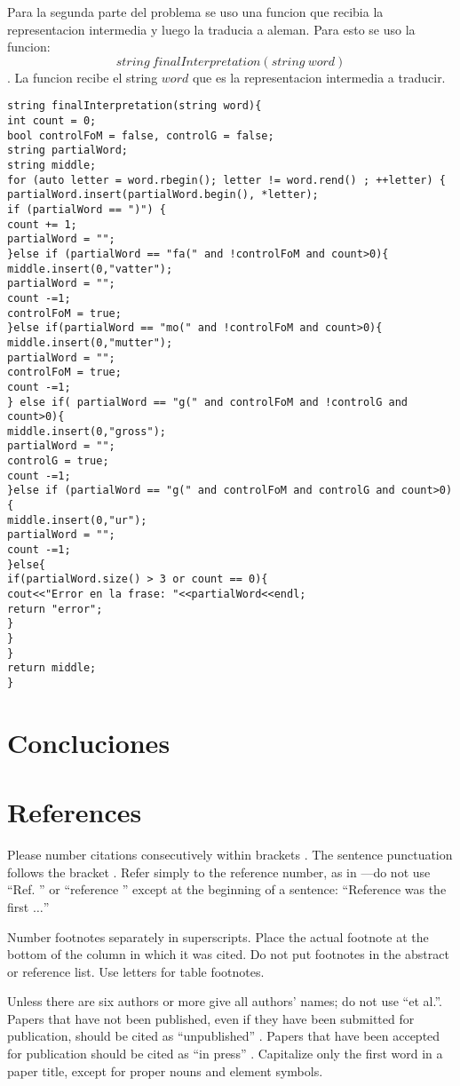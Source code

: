 \documentclass[conference]{IEEEtran}
\begin{document}
Para la segunda parte del problema se uso una funcion que recibia la representacion intermedia y luego la traducia a aleman. Para esto se uso la funcion: 
$$string\  finalInterpretation(string\  word) $$
. La funcion recibe el string $word$ que es la representacion intermedia a traducir. 

\begin{lstlisting}
string finalInterpretation(string word){
int count = 0;
bool controlFoM = false, controlG = false;
string partialWord;
string middle;
for (auto letter = word.rbegin(); letter != word.rend() ; ++letter) {
partialWord.insert(partialWord.begin(), *letter);
if (partialWord == ")") {
count += 1;
partialWord = "";
}else if (partialWord == "fa(" and !controlFoM and count>0){
middle.insert(0,"vatter");
partialWord = "";
count -=1;
controlFoM = true;
}else if(partialWord == "mo(" and !controlFoM and count>0){
middle.insert(0,"mutter");
partialWord = "";
controlFoM = true;
count -=1;
} else if( partialWord == "g(" and controlFoM and !controlG and count>0){
middle.insert(0,"gross");
partialWord = "";
controlG = true;
count -=1;
}else if (partialWord == "g(" and controlFoM and controlG and count>0){
middle.insert(0,"ur");
partialWord = "";
count -=1;
}else{
if(partialWord.size() > 3 or count == 0){
cout<<"Error en la frase: "<<partialWord<<endl;
return "error";
}
}
}
return middle;
}
\end{lstlisting}



\section{Concluciones}


\section*{References}

Please number citations consecutively within brackets \cite{b1}. The 
sentence punctuation follows the bracket \cite{b2}. Refer simply to the reference 
number, as in \cite{b3}---do not use ``Ref. \cite{b3}'' or ``reference \cite{b3}'' except at 
the beginning of a sentence: ``Reference \cite{b3} was the first $\ldots$''

Number footnotes separately in superscripts. Place the actual footnote at 
the bottom of the column in which it was cited. Do not put footnotes in the 
abstract or reference list. Use letters for table footnotes.

Unless there are six authors or more give all authors' names; do not use 
``et al.''. Papers that have not been published, even if they have been 
submitted for publication, should be cited as ``unpublished'' \cite{b4}. Papers 
that have been accepted for publication should be cited as ``in press'' \cite{b5}. 
Capitalize only the first word in a paper title, except for proper nouns and 
element symbols.
\end{document}
